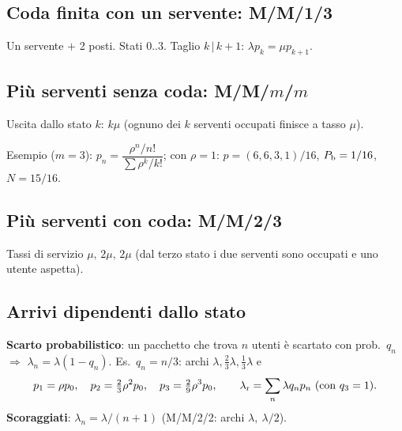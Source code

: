 \subsection{Coda finita con un servente: M/M/1/3}
Un servente $+$ 2 posti. Stati $0..3$. Taglio $k\,|\,k{+}1$: $\lambda p_k=\mu p_{k+1}$.
\begin{center}
\end{center}

\subsection{Più serventi senza coda: M/M/$m$/$m$}
Uscita dallo stato $k$: $k\mu$ (ognuno dei $k$ serventi occupati finisce a tasso $\mu$).
\begin{center}
\end{center}
Esempio ($m=3$): $p_n=\dfrac{\rho^n/n!}{\sum\rho^k/k!}$; con $\rho=1$: $p=(6,6,3,1)/16$, $P_{\mathrm{b}}=1/16$, $N=15/16$.

\subsection{Più serventi con coda: M/M/2/3}
Tassi di servizio $\mu,\,2\mu,\,2\mu$ (dal terzo stato i due serventi sono occupati e uno utente aspetta).
\begin{center}
\end{center}

\subsection{Arrivi dipendenti dallo stato}
\textbf{Scarto probabilistico}: un pacchetto che trova $n$ utenti è scartato con prob.\ $q_n$ $\Rightarrow$ $\lambda_n=\lambda(1-q_n)$. Es.\ $q_n=n/3$: archi $\lambda,\tfrac23\lambda,\tfrac13\lambda$ e
\[
p_1=\rho p_0,\quad p_2=\tfrac23\rho^2p_0,\quad p_3=\tfrac29\rho^3p_0,\qquad
\lambda_{\mathrm{r}}=\sum_n\lambda q_np_n\ (\text{con }q_3=1).
\]
\textbf{Scoraggiati}: $\lambda_n=\lambda/(n+1)$ (M/M/2/2: archi $\lambda,\ \lambda/2$).

